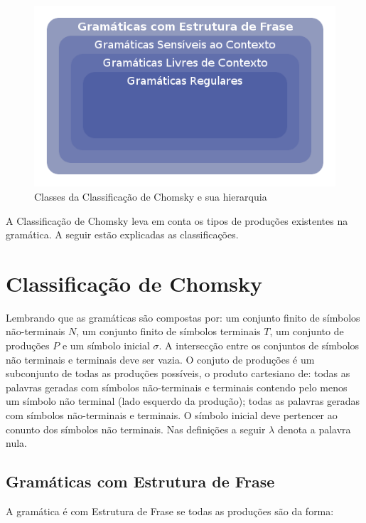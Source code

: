 \begin{figure}[H]
	\caption{\label{gram_cls}Classes da Classificação de Chomsky e sua hierarquia}
	\begin{center}
	    \includegraphics[scale=0.5]{driagrama_classes_gramaticas.png}
	\end{center}
\end{figure}

A Classificação de Chomsky leva em conta os tipos de produções existentes na gramática. A seguir estão explicadas as classificações.

\section{Classificação de Chomsky}
Lembrando que as gramáticas são compostas por: um conjunto finito de símbolos não-terminais $N$, um conjunto finito de símbolos terminais $T$, um conjunto de produções $P$ e um símbolo inicial $\sigma$. A intersecção entre os conjuntos de símbolos não terminais e terminais deve ser vazia. O conjuto de produções é um subconjunto de todas as produções possíveis, o produto cartesiano de: todas as palavras geradas com símbolos não-terminais e terminais contendo pelo menos um símbolo não terminal (lado esquerdo da produção); todas as palavras geradas com símbolos não-terminais e terminais. O símbolo inicial deve pertencer ao conunto dos símbolos não terminais. Nas definições a seguir $\lambda$ denota a palavra nula.

\subsection{Gramáticas com Estrutura de Frase}
A gramática é com Estrutura de Frase se todas as produções são da forma:

